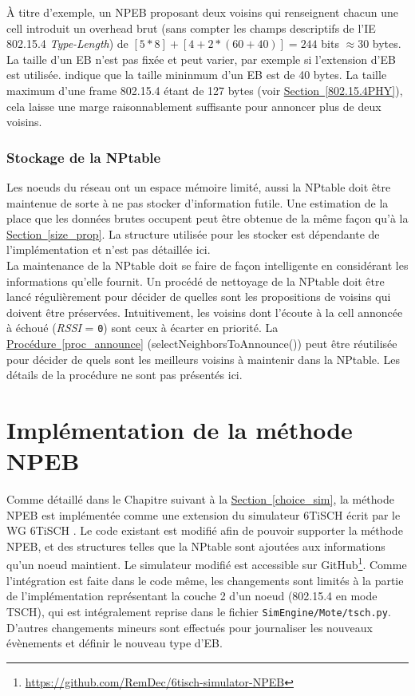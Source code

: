 \documentclass[]{report}
\newcommand{\wordlink}[2]{\hyperref[#2]{#1~\ref{#2}}}
\begin{document}
À titre d'exemple, un NPEB proposant deux voisins qui renseignent chacun une cell introduit un overhead brut (sans compter les champs descriptifs de l'IE 802.15.4 \textit{Type-Length}) de $[5*8] + [4+2*(60+40)] = 244$ bits $\approx 30$ bytes. La taille d'un EB n'est pas fixée et peut varier, par exemple si l'extension d'EB \cite{ietf-6tisch-enrollment-enhanced-beacon-14} est utilisée. \cite{ATP} indique que la taille mininmum d'un EB est de 40 bytes. La taille maximum d'une frame 802.15.4 étant de 127 bytes (voir \wordlink{Section}{802.15.4PHY}), cela laisse une marge raisonnablement suffisante pour annoncer plus de deux voisins.

\newpage

\subsubsection{Stockage de la NPtable}

Les noeuds du réseau ont un espace mémoire limité, aussi la NPtable doit être maintenue de sorte à ne pas stocker d'information futile. Une estimation de la place que les données brutes occupent peut être obtenue de la même façon qu'à la \wordlink{Section}{size_prop}. La structure utilisée pour les stocker est dépendante de l'implémentation et n'est pas détaillée ici.\\

La maintenance de la NPtable doit se faire de façon intelligente en considérant les informations qu'elle fournit. Un procédé de nettoyage de la NPtable doit être lancé régulièrement pour décider de quelles sont les propositions de voisins qui doivent être préservées. Intuitivement, les voisins dont l'écoute à la cell annoncée à échoué (\textit{RSSI} = \texttt{0}) sont ceux à écarter en priorité. La \wordlink{Procédure}{proc_announce} (selectNeighborsToAnnounce()) peut être réutilisée pour décider de quels sont les meilleurs voisins à maintenir dans la NPtable. Les détails de la procédure ne sont pas présentés ici.


\section{Implémentation de la méthode NPEB}
\label{implem_NPEB}

Comme détaillé dans le Chapitre suivant à la \wordlink{Section}{choice_sim}, la méthode NPEB est implémentée comme une extension du simulateur 6TiSCH écrit par le WG 6TiSCH \cite{simulating-6TiSCH}. Le code existant est modifié afin de pouvoir supporter la méthode NPEB, et des structures telles que la NPtable sont ajoutées aux informations qu'un noeud maintient. Le simulateur modifié est accessible sur GitHub\footnote{\url{https://github.com/RemDec/6tisch-simulator-NPEB}}. Comme l'intégration est faite dans le code même, les changements sont limités à la partie de l'implémentation représentant la couche 2 d'un noeud (802.15.4 en mode TSCH), qui est intégralement reprise dans le fichier \texttt{SimEngine/Mote/tsch.py}. D'autres changements mineurs sont effectués pour journaliser les nouveaux évènements et définir le nouveau type d'EB.\\
\end{document}
